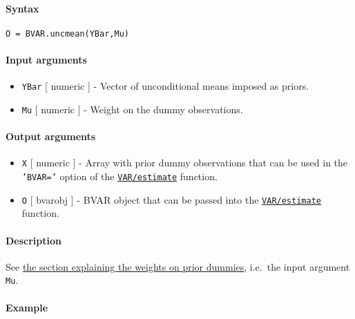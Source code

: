 


	\paragraph{Syntax}\label{syntax}

\begin{verbatim}
O = BVAR.uncmean(YBar,Mu)
\end{verbatim}

\paragraph{Input arguments}\label{input-arguments}

\begin{itemize}
\item
  \texttt{YBar} {[} numeric {]} - Vector of unconditional means imposed
  as priors.
\item
  \texttt{Mu} {[} numeric {]} - Weight on the dummy observations.
\end{itemize}

\paragraph{Output arguments}\label{output-arguments}

\begin{itemize}
\item
  \texttt{X} {[} numeric {]} - Array with prior dummy observations that
  can be used in the \texttt{'BVAR='} option of the
  \href{VAR/estimate}{\texttt{VAR/estimate}} function.
\item
  \texttt{O} {[} bvarobj {]} - BVAR object that can be passed into the
  \href{VAR/estimate}{\texttt{VAR/estimate}} function.
\end{itemize}

\paragraph{Description}\label{description}

See \href{BVAR/Contents}{the section explaining the weights on prior
dummies}, i.e.~the input argument \texttt{Mu}.

\paragraph{Example}\label{example}


